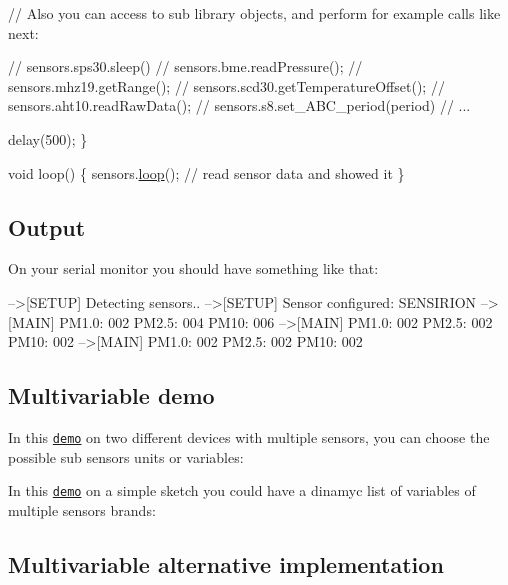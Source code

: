 \begin{DoxyCode}
    \textcolor{comment}{// Also you can access to sub library objects, and perform for example calls like next:}

    \textcolor{comment}{// sensors.sps30.sleep()}
    \textcolor{comment}{// sensors.bme.readPressure();}
    \textcolor{comment}{// sensors.mhz19.getRange();}
    \textcolor{comment}{// sensors.scd30.getTemperatureOffset();}
    \textcolor{comment}{// sensors.aht10.readRawData();}
    \textcolor{comment}{// sensors.s8.set\_ABC\_period(period)}
    \textcolor{comment}{// ...}

    delay(500);
\}

\textcolor{keywordtype}{void} loop() \{
    sensors.\hyperlink{classSensors_a255ece4e475221edb8ba7a8983014a76}{loop}();  \textcolor{comment}{// read sensor data and showed it}
\}
\end{DoxyCode}


\subsection*{Output}

On your serial monitor you should have something like that\+:


\begin{DoxyCode}
-->[SETUP] Detecting sensors..
-->[SETUP] Sensor configured: SENSIRION
-->[MAIN] PM1.0: 002 PM2.5: 004 PM10: 006
-->[MAIN] PM1.0: 002 PM2.5: 002 PM10: 002
-->[MAIN] PM1.0: 002 PM2.5: 002 PM10: 002
\end{DoxyCode}


\subsection*{Multivariable demo}

In this \href{https://www.youtube.com/watch?v=-5Va47Bap48}{\tt demo} on two different devices with multiple sensors, you can choose the possible sub sensors units or variables\+:

\href{https://www.youtube.com/watch?v=-5Va47Bap48}{\tt }

In this \href{https://www.youtube.com/watch?v=uxlmP905-FE}{\tt demo} on a simple sketch you could have a dinamyc list of variables of multiple sensors brands\+:

\href{https://youtu.be/i15iEF47CbY}{\tt }

\subsection*{Multivariable alternative implementation}

